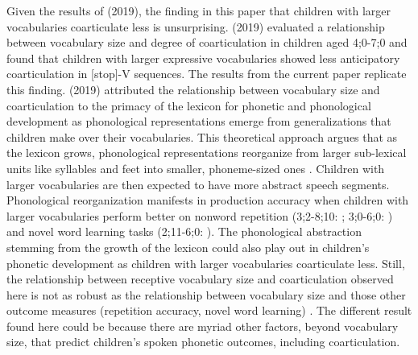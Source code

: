 \documentclass[a4paper,man,natbib,donotrepeattitle, apacite]{apa6}
\begin{document}
Given the results of \citeauthor{noiraySpokenLanguageDevelopment2019} (2019), the finding in this paper that children with larger vocabularies coarticulate less is unsurprising. \citeauthor{noiraySpokenLanguageDevelopment2019} (2019) evaluated a relationship between vocabulary size and degree of coarticulation in children aged 4;0-7;0 and found that children with larger expressive vocabularies showed less anticipatory coarticulation in [stop]-V sequences. The results from the current paper replicate this finding. \citeauthor{noiraySpokenLanguageDevelopment2019} (2019) attributed the relationship between vocabulary size and coarticulation to the primacy of the lexicon for phonetic and phonological development as phonological representations emerge from generalizations that children make over their vocabularies.  This theoretical approach argues that as the lexicon grows, phonological representations reorganize from larger sub-lexical units like syllables and feet into smaller, phoneme-sized ones \cite{beckmanGeneralizingLexiconsPredict2010,edwardsInteractionVocabularySize2004,metsalaYoungChildrenPhonological1999,metsalaSpokenVocabularyGrowth1998,storkelInfluencePartwordPhonotactic2011,storkelLexiconPhonologyInteractions2002}. Children with larger vocabularies are then expected to have more abstract speech segments. Phonological reorganization manifests in production accuracy when children with larger vocabularies perform better on nonword repetition (3;2-8;10: ; 3;0-6;0: ) and novel word learning tasks (2;11-6;0: ). The phonological abstraction stemming from the growth of the lexicon could also play out in children’s phonetic development as children with larger vocabularies coarticulate less. Still, the relationship between receptive vocabulary size and coarticulation observed here is not as robust as the relationship between vocabulary size and those other outcome measures (repetition accuracy, novel word learning) \cite{edwardsInteractionVocabularySize2004,metsalaYoungChildrenPhonological1999,storkelInfluencePartwordPhonotactic2011}. The different result found here could be because there are myriad other factors, beyond vocabulary size, that predict children’s spoken phonetic outcomes, including coarticulation. 
\end{document}
